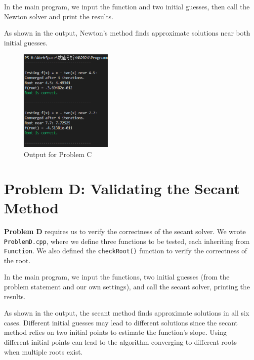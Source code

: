 \documentclass[a4paper]{article}
\begin{document}
In the main program, we input the function and two initial guesses, then call the Newton solver and print the results. 

As shown in the output, Newton's method finds approximate solutions near both initial guesses.

\begin{figure}[H]  %
  \centering
  \includegraphics[width=0.4\textwidth]{./picture/ProblemC.png}
  \caption{Output for Problem C}
\end{figure}

\section{Problem D: Validating the Secant Method}

\textbf{Problem D} requires us to verify the correctness of the secant solver. We wrote \texttt{ProblemD.cpp}, where we define three functions to be tested, each inheriting from \texttt{Function}. We also defined the \texttt{checkRoot()} function to verify the correctness of the root.

In the main program, we input the functions, two initial guesses (from the problem statement and our own settings), and call the secant solver, printing the results.

As shown in the output, the secant method finds approximate solutions in all six cases. Different initial guesses may lead to different solutions since the secant method relies on two initial points to estimate the function's slope. Using different initial points can lead to the algorithm converging to different roots when multiple roots exist.
\end{document}
